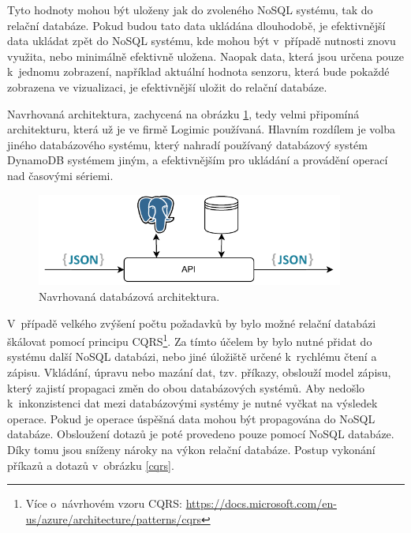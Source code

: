 Tyto hodnoty mohou být uloženy jak do zvoleného NoSQL systému, tak do relační databáze. Pokud budou tato data ukládána dlouhodobě, je efektivnější data ukládat zpět do NoSQL systému, kde mohou být v~případě nutnosti znovu využita, nebo minimálně efektivně uložena. Naopak data, která jsou určena pouze k~jednomu zobrazení, například aktuální hodnota senzoru, která bude pokaždé zobrazena ve vizualizaci, je efektivnější uložit do relační databáze.

Navrhovaná architektura, zachycená na obrázku \ref{databaseArchitecture}, tedy velmi připomíná architekturu, která už je ve firmě Logimic používaná. Hlavním rozdílem je volba jiného databázového systému, který nahradí používaný databázový systém DynamoDB systémem jiným, a efektivnějším pro ukládání a provádění operací nad časovými sériemi. 

\begin{figure}[H]
\label{databaseArchitecture}
\begin{center}
    \includegraphics[width=0.9\textwidth]{obrazky-figures/databaseArchitecture.pdf}
\end{center}
\caption{Navrhovaná databázová architektura.}
\end{figure}

V~případě velkého zvýšení počtu požadavků by bylo možné relační databázi škálovat pomocí principu CQRS\footnote{Více o~návrhovém vzoru CQRS: \url{https://docs.microsoft.com/en-us/azure/architecture/patterns/cqrs}}. Za tímto účelem by bylo nutné přidat do systému další NoSQL databázi, nebo jiné úložiště určené k~rychlému čtení a zápisu. Vkládání, úpravu nebo mazání dat, tzv. příkazy, obslouží model zápisu, který zajistí propagaci změn do obou databázových systémů. Aby nedošlo k~inkonzistenci dat mezi databázovými systémy je nutné vyčkat na výsledek operace. Pokud je operace úspěšná data mohou být propagována do NoSQL databáze. Obsloužení dotazů je poté provedeno pouze pomocí NoSQL databáze. Díky tomu jsou sníženy nároky na výkon relační databáze. Postup vykonání příkazů a dotazů v~obrázku \ref{cqrs}.

